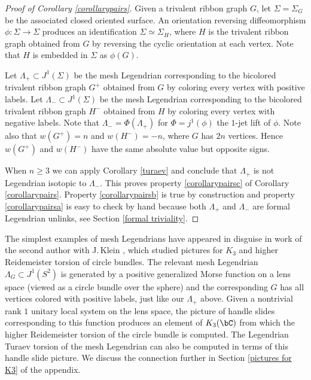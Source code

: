 \begin{proof}[Proof of Corollary \ref{corollarypairs}] Given a trivalent ribbon graph $G$, let $\Sigma=\Sigma_G$ be the associated closed oriented surface. An orientation reversing diffeomorphism $\phi: \Sigma \to \Sigma$ produces an identification $\Sigma \simeq \Sigma_{H}$, where $H$ is the trivalent ribbon graph obtained from $G$ by reversing the cyclic orientation at each vertex. Note that $H$ is embedded in $\Sigma$ as $\phi(G)$.

Let $\Lambda_+ \subset J^1(\Sigma)$ be the mesh Legendrian corresponding to the bicolored trivalent ribbon graph $G^+$ obtained from $G$ by coloring every vertex with positive labels. Let $\Lambda_- \subset J^1(\Sigma)$ be the mesh Legendrian corresponding to the bicolored trivalent ribbon graph $H^-$ obtained from $H$ by coloring every vertex with negative labels. Note that $\Lambda_-=\Phi(\Lambda_+)$ for $\Phi=j^1(\phi)$ the $1$-jet lift of $\phi$. Note also that $w(G^+)=n$ and $w(H^-)=-n$, where $G$ has $2n$ vertices. Hence $w(G^+)$ and $w( H^-)$ have the same absolute value but opposite signs.

When $n\geq 3$ we can apply Corollary \ref{turaev} and conclude that $\Lambda_+$ is not Legendrian isotopic to $\Lambda_-$. This proves property \eqref{corollarypairsc} of Corollary \ref{corollarypairs}. Property \eqref{corollarypairsb} is true by construction and property \eqref{corollarypairsa} is easy to check by hand because both $\Lambda_+$ and $\Lambda_-$ are formal Legendrian unlinks, see Section \ref{formal triviality}. \end{proof}
The simplest examples of mesh Legendrians have appeared in disguise in work of the second author with J.\,Klein \cite{IK93}, which studied pictures for $K_3$ and higher Reidemeister torsion of circle bundles. The relevant mesh Legendrian $\Lambda_G \subset J^1(S^2)$ is generated by a positive generalized Morse function on a lens space (viewed as a circle bundle over the sphere) and the corresponding $G$ has all vertices colored with positive labels, just like our $\Lambda_+$ above. Given a nontrivial rank $1$ unitary local system on the lens space, the picture of handle slides corresponding to this function produces an element of $K_3(\bC)$ from which the higher Reidemeister torsion of the circle bundle is computed. The Legendrian Turaev torsion of the mesh Legendrian can also be computed in terms of this handle slide picture. We discuss the connection further in Section \ref{pictures for K3} of the appendix.

